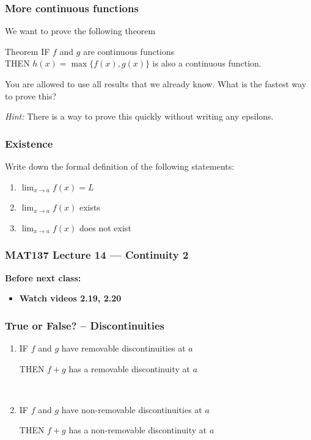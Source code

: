 \documentclass[14pt]{beamer}
\newcommand {\DS} [1] {${\displaystyle #1}$}
\begin{document}
\begin{frame}
\frametitle{More continuous functions}

We want to prove the following theorem
\begin{block}{Theorem}
IF $f$ and $g$ are continuous functions \\
THEN $h(x) = \max \{ f(x), g(x) \}$ is also a continuous function.
\end{block}

You are allowed to use all results that we already know.  What is the fastest way to prove this?


\vfill


\emph{Hint:}  
There is a way to prove this quickly without writing any epsilons.

\vfill

\end{frame}

\begin{frame}
\frametitle{Existence}

Write down the formal definition of the following statements:

\vfill
\begin{enumerate}

\item  \DS{\lim_{x \to a} f(x) = L}
\vfill

\item  \DS{\lim_{x \to a} f(x) } exists

\vfill
\item  \DS{\lim_{x \to a} f(x) } does not exist

\end{enumerate}

\vfill

\end{frame}


\begin{frame}
\frametitle{MAT137 Lecture 14 --- Continuity 2}
	{\bf Before next class:}
		\begin{itemize} \normalsize
			\item {\bf Watch videos 2.19, 2.20 }
		\end{itemize}
	\vfill

\end{frame}


\begin{frame}
\frametitle{True or False? -- Discontinuities}

	\begin{enumerate}
		\item IF $f$ and $g$ have removable discontinuities at $a$
		
			THEN  $f+g$ has a removable discontinuity at $a$
		
		\
		\item IF $f$ and $g$ have non-removable discontinuities at $a$
		
			THEN $f+g$ has a non-removable discontinuity at $a$
	\end{enumerate}


\end{frame}
\end{document}
